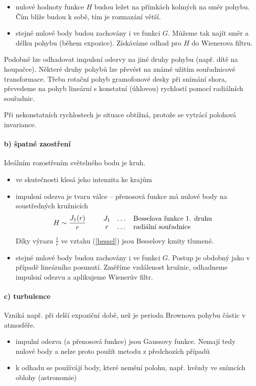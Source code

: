 \begin{itemize}
\item nulové hodnoty funkce $H$ budou ležet na přímkách kolmých na směr pohybu. Čím blíže budou k sobě, tím je rozmazání 
větší. 
\item stejné nulové body budou zachovány i ve funkci $G$. Můžeme tak najít směr a délku pohybu (během
expozice). Získáváme odhad pro $H$ do Wienerova filtru. 
\end{itemize}

Podobně lze odhadovat impulsní odezvy na jiné druhy pohybu (např. dítě na houpačce). Některé druhy pohybů lze převést na
známé užitím souřadnicové transformace. Třeba rotační pohyb gramofonové desky při snímání shora, převedeme na pohyb 
lineární s konstatní (úhlovou) rychlostí pomocí radiálních souřadnic.

Při nekonstatních rychlostech je situace obtížná, protože se vytrácí polohová invariance.


\paragraph{b) špatné zaostření} Ideálním rozostřením světelného bodu je kruh. 
\begin{itemize}
\item ve skutečnosti klesá jeho intenzita ke krajům
\item impulsní odezva je tvaru válce -- přenosová funkce má nulové body na soustředných kružnicích
 \begin{align}
  H\sim \frac{J_1(r)}{r}\label{bessel}\qquad\begin{array}{ccl}\hbox{$J_1$}&\hbox{\dots}&\hbox{Besselova funkce 1. druhu}\\
  \hbox{$r$}&\hbox{\dots}&\hbox{radiální souřadnice}
  \end{array}
 \end{align}
Díky výrazu $\frac{1}{r}$ ve vztahu (\ref{bessel}) jsou Besselovy kmity tlumené.

\item stejné nulové body budou zachovány i ve funkci $G$. Postup je obdobný jako v případě lineárního posunutí.
Změříme vzdálenost kružnic, odhadneme impulsní odezvu a aplikujeme Wienerův filtr. 
\end{itemize}

\paragraph{c) turbulence} Vzniká např. při delší expoziční době, než je perioda Brownova pohybu částic v atmosféře. 
\begin{itemize}
\item impulní odezva (a přenosová funkce) jsou Gaussovy funkce. Nemají tedy nulové body a nelze proto použít metodu
z předchozích případů
\item k odhadu se používájí body, které nemění polohu, např. hvězdy ve snímcích oblohy (astronomie)
\end{itemize}

